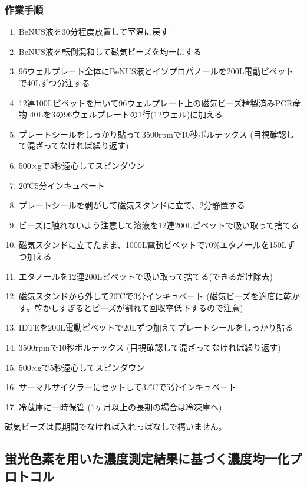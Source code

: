 \documentclass[titlepage,10pt,a4paper,uplatex]{jsbook}
\begin{document}
\subsubsection{作業手順}
\begin{enumerate}
\item BeNUS液を30分程度放置して室温に戻す
\item BeNUS液を転倒混和して磁気ビーズを均一にする
\item 96ウェルプレート全体にBeNUS液とイソプロパノールを200{\textmu}L電動ピペットで40{\textmu}Lずつ分注する
\item 12連100{\textmu}Lピペットを用いて96ウェルプレート上の磁気ビーズ精製済みPCR産物 40{\textmu}Lを3の96ウェルプレートの1行(12ウェル)に加える
\item プレートシールをしっかり貼って3500rpmで10秒ボルテックス (目視確認して混ざってなければ繰り返す)
\item 500×gで5秒遠心してスピンダウン
\item 20℃5分インキュベート
\item プレートシールを剥がして磁気スタンドに立て、2分静置する
\item ビーズに触れないよう注意して溶液を12連200{\textmu}Lピペットで吸い取って捨てる
\item 磁気スタンドに立てたまま、1000{\textmu}L電動ピペットで70\%エタノールを150{\textmu}Lずつ加える
\item エタノールを12連200{\textmu}Lピペットで吸い取って捨てる(できるだけ除去)
\item 磁気スタンドから外して20℃で3分インキュベート (磁気ビーズを適度に乾かす。乾かしすぎるとビーズが割れて回収率低下するので注意)
\item IDTEを200{\textmu}L電動ピペットで20{\textmu}Lずつ加えてプレートシールをしっかり貼る
\item 3500rpmで10秒ボルテックス (目視確認して混ざってなければ繰り返す)
\item 500×gで5秒遠心してスピンダウン
\item サーマルサイクラーにセットして37℃で5分インキュベート
\item 冷蔵庫に一時保管 (1ヶ月以上の長期の場合は冷凍庫へ)
\end{enumerate}

磁気ビーズは長期間でなければ入れっぱなしで構いません。

\subsection{蛍光色素を用いた濃度測定結果に基づく濃度均一化プロトコル}
\end{document}
